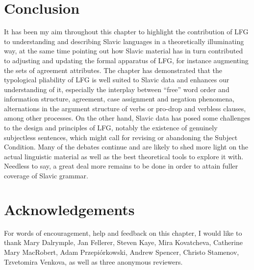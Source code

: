 \documentclass[output=paper,hidelinks]{langscibook}
\begin{document}
\section{Conclusion}
\label{sec:Slavic:4}

It has been my aim throughout this chapter to highlight the contribution of LFG to understanding and describing Slavic languages in a theoretically illuminating way, at the same time pointing out how Slavic material has in turn contributed to adjusting and updating the formal apparatus of LFG, for instance augmenting the sets of agreement attributes. The chapter has demonstrated that the typological pliability of LFG is well suited to Slavic data and enhances our understanding of it, especially the interplay between ``free'' word order and information structure, agreement, case assignment and negation phenomena, alternations in the argument structure of verbs or pro-drop and verbless clauses, among other processes. On the other hand, Slavic data has posed some challenges to the design and principles of LFG, notably the existence of genuinely subjectless sentences, which might call for revising or abandoning the Subject Condition. Many of the debates continue and are likely to shed more light on the actual linguistic material as well as the best theoretical tools to explore it with. Needless to say, a great deal more remains to be done in order to attain fuller coverage of Slavic grammar.

\section*{Acknowledgements}

For words of encouragement, help and feedback on this chapter, I would like to thank Mary Dalrymple, Jan Fellerer, Steven Kaye, Mira Kovatcheva, Catherine Mary MacRobert, Adam Przepi{\'o}rkowski, Andrew Spencer, Christo Stamenov, Tzvetomira Venkova, as well as three anonymous reviewers.

\sloppy\printbibliography[heading=subbibliography,notkeyword=this]
\end{document}
